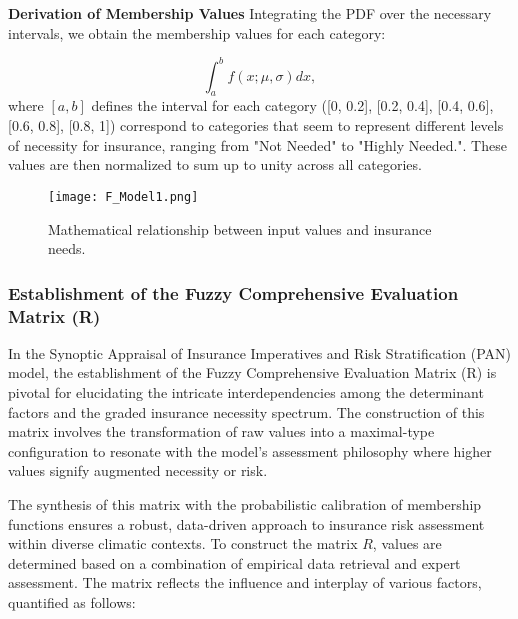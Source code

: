 \documentclass{mcmthesis}
\begin{document}
\textbf{Derivation of Membership Values}
Integrating the PDF over the necessary intervals, we obtain the membership values for each category:

\begin{equation}
\int_{a}^{b} f(x; \mu, \sigma) dx,
\end{equation}
where $[a, b]$ defines the interval for each category ([0, 0.2], [0.2, 0.4], [0.4, 0.6], [0.6, 0.8], [0.8, 1]) correspond to categories that seem to represent different levels of necessity for insurance, ranging from "Not Needed" to "Highly Needed.". These values are then normalized to sum up to unity across all categories.

\begin{figure}[h]
\centering
\texttt{[image: F\_Model1.png]}
\caption{Mathematical relationship between input values and insurance needs.}
\label{fig:math_rel}
\end{figure}

\subsubsection{Establishment of the Fuzzy Comprehensive Evaluation Matrix (R)}
In the Synoptic Appraisal of Insurance Imperatives and Risk Stratification (PAN) model, the establishment of the Fuzzy Comprehensive Evaluation Matrix (R) is pivotal for elucidating the intricate interdependencies among the determinant factors and the graded insurance necessity spectrum. The construction of this matrix involves the transformation of raw values into a maximal-type configuration to resonate with the model's assessment philosophy where higher values signify augmented necessity or risk.

The synthesis of this matrix with the probabilistic calibration of membership functions ensures a robust, data-driven approach to insurance risk assessment within diverse climatic contexts. To construct the matrix \( R \), values are determined based on a combination of empirical data retrieval and expert assessment. The matrix reflects the influence and interplay of various factors, quantified as follows:
\end{document}
